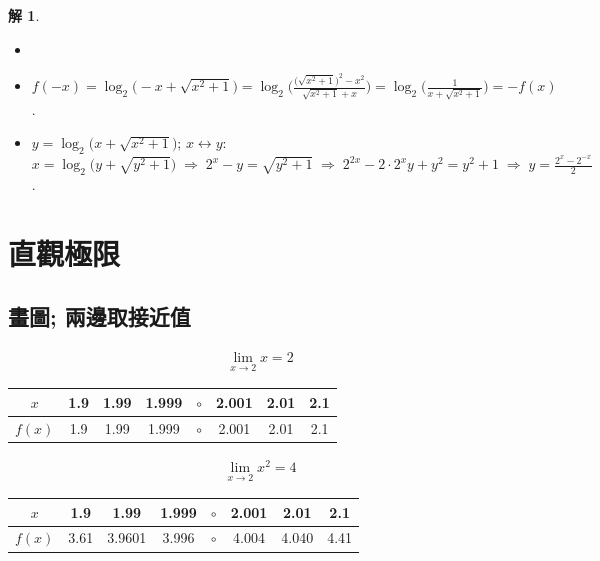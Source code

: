 \documentclass[12pt]{extarticle}
\newcommand{\ds}{\displaystyle}
\newcommand{\ie}{\;\Longrightarrow\;}
\theoremstyle{definition}
\newtheorem*{sol}{解}
\begin{document}
\begin{sol}
  \vspace{-0.5em}
  \begin{itemize}\setlength\itemsep{0em}
    \item[]
    \item $\ds f(-x) = \log_2\big(-x + \sqrt{x^2 + 1}\big) = \log_2\bigg(\frac{\big(\sqrt{x^2 + 1}\big)^2 - x^2}{\sqrt{x^2 + 1} + x}\bigg) = \log_2\bigg(\frac{1}{x + \sqrt{x^2 + 1}}\bigg) = -f(x)$. 
    \item $\ds y = \log_2\big(x + \sqrt{x^2 + 1}\big)$; $x\longleftrightarrow y$: $\ds x = \log_2\big(y + \sqrt{y^2 + 1}\big)\ie 2^x - y = \sqrt{y^2 + 1} \ie 2^{2x} - 2\cdot2^x y + y^2 = y^2 + 1 \ie y = \frac{2^x - 2^{-x}}{2}$. 
  \end{itemize}
\end{sol}

\section*{直觀極限}

\subsection*{畫圖; 兩邊取接近值}

\begin{align*}
  \lim_{x\to 2}x = 2
\end{align*}

\begin{center}
  \begin{tabular}{cccccccc}
    \toprule
    $x$ & 1.9 & 1.99 & 1.999 & $\circ$ & 2.001 & 2.01 & 2.1 \\
    \hline
    \addlinespace[2mm]
    $f(x)$ & 1.9 & 1.99 & 1.999 & $\circ$ & 2.001 & 2.01 & 2.1 \\
    \bottomrule
  \end{tabular}
\end{center}

\begin{align*}
  \lim_{x\to 2}x^2 = 4
\end{align*}

\begin{center}
  \begin{tabular}{cccccccc}
    \toprule
    $x$ & 1.9 & 1.99 & 1.999 & $\circ$ & 2.001 & 2.01 & 2.1 \\
    \hline
    \addlinespace[2mm]
    $f(x)$ & 3.61 & 3.9601 & 3.996 & $\circ$ & 4.004 & 4.040 & 4.41 \\
    \bottomrule
  \end{tabular}
\end{center}
\end{document}
